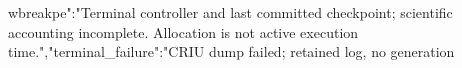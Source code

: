 \documentclass[10pt]{article}
\begin{document}
wbreak{}p\allowbreak{}e\allowbreak{}"\allowbreak{}:\allowbreak{}"\allowbreak{}T\allowbreak{}e\allowbreak{}r\allowbreak{}m\allowbreak{}i\allowbreak{}n\allowbreak{}a\allowbreak{}l\allowbreak{} \allowbreak{}c\allowbreak{}o\allowbreak{}n\allowbreak{}t\allowbreak{}r\allowbreak{}o\allowbreak{}l\allowbreak{}l\allowbreak{}e\allowbreak{}r\allowbreak{} \allowbreak{}a\allowbreak{}n\allowbreak{}d\allowbreak{} \allowbreak{}l\allowbreak{}a\allowbreak{}s\allowbreak{}t\allowbreak{} \allowbreak{}c\allowbreak{}o\allowbreak{}m\allowbreak{}m\allowbreak{}i\allowbreak{}t\allowbreak{}t\allowbreak{}e\allowbreak{}d\allowbreak{} \allowbreak{}c\allowbreak{}h\allowbreak{}e\allowbreak{}c\allowbreak{}k\allowbreak{}p\allowbreak{}o\allowbreak{}i\allowbreak{}n\allowbreak{}t\allowbreak{};\allowbreak{} \allowbreak{}s\allowbreak{}c\allowbreak{}i\allowbreak{}e\allowbreak{}n\allowbreak{}t\allowbreak{}i\allowbreak{}f\allowbreak{}i\allowbreak{}c\allowbreak{} \allowbreak{}a\allowbreak{}c\allowbreak{}c\allowbreak{}o\allowbreak{}u\allowbreak{}n\allowbreak{}t\allowbreak{}i\allowbreak{}n\allowbreak{}g\allowbreak{} \allowbreak{}i\allowbreak{}n\allowbreak{}c\allowbreak{}o\allowbreak{}m\allowbreak{}p\allowbreak{}l\allowbreak{}e\allowbreak{}t\allowbreak{}e\allowbreak{}.\allowbreak{} \allowbreak{}A\allowbreak{}l\allowbreak{}l\allowbreak{}o\allowbreak{}c\allowbreak{}a\allowbreak{}t\allowbreak{}i\allowbreak{}o\allowbreak{}n\allowbreak{} \allowbreak{}i\allowbreak{}s\allowbreak{} \allowbreak{}n\allowbreak{}o\allowbreak{}t\allowbreak{} \allowbreak{}a\allowbreak{}c\allowbreak{}t\allowbreak{}i\allowbreak{}v\allowbreak{}e\allowbreak{} \allowbreak{}e\allowbreak{}x\allowbreak{}e\allowbreak{}c\allowbreak{}u\allowbreak{}t\allowbreak{}i\allowbreak{}o\allowbreak{}n\allowbreak{} \allowbreak{}t\allowbreak{}i\allowbreak{}m\allowbreak{}e\allowbreak{}.\allowbreak{}"\allowbreak{},\allowbreak{}"\allowbreak{}t\allowbreak{}e\allowbreak{}r\allowbreak{}m\allowbreak{}i\allowbreak{}n\allowbreak{}a\allowbreak{}l\allowbreak{}\_\allowbreak{}f\allowbreak{}a\allowbreak{}i\allowbreak{}l\allowbreak{}u\allowbreak{}r\allowbreak{}e\allowbreak{}"\allowbreak{}:\allowbreak{}"\allowbreak{}C\allowbreak{}R\allowbreak{}I\allowbreak{}U\allowbreak{} \allowbreak{}d\allowbreak{}u\allowbreak{}m\allowbreak{}p\allowbreak{} \allowbreak{}f\allowbreak{}a\allowbreak{}i\allowbreak{}l\allowbreak{}e\allowbreak{}d\allowbreak{};\allowbreak{} \allowbreak{}r\allowbreak{}e\allowbreak{}t\allowbreak{}a\allowbreak{}i\allowbreak{}n\allowbreak{}e\allowbreak{}d\allowbreak{} \allowbreak{}l\allowbreak{}o\allowbreak{}g\allowbreak{},\allowbreak{} \allowbreak{}n\allowbreak{}o\allowbreak{} \allowbreak{}g\allowbreak{}e\allowbreak{}n\allowbreak{}e\allowbreak{}r\allowbreak{}a\allowbreak{}t\allowbreak{}i\allowbreak{}o\allowbreak{}n\allowbreak{} 
\end{document}
